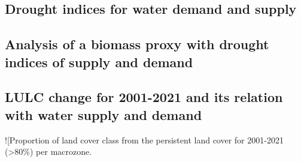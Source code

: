 \documentclass[
  number,
  preprint,
  3p]{elsarticle}
\begin{document}
\hypertarget{drought-indices-for-water-demand-and-supply}{%
\subsection{Drought indices for water demand and
supply}\label{drought-indices-for-water-demand-and-supply}}

\hypertarget{analysis-of-a-biomass-proxy-with-drought-indices-of-supply-and-demand}{%
\subsection{Analysis of a biomass proxy with drought indices of supply
and
demand}\label{analysis-of-a-biomass-proxy-with-drought-indices-of-supply-and-demand}}

\hypertarget{lulc-change-for-2001-2021-and-its-relation-with-water-supply-and-demand}{%
\subsection{LULC change for 2001-2021 and its relation with water supply
and
demand}\label{lulc-change-for-2001-2021-and-its-relation-with-water-supply-and-demand}}

!{[}Proportion of land cover class from the persistent land cover for
2001-2021 (\textgreater80\%) per macrozone.
\end{document}
